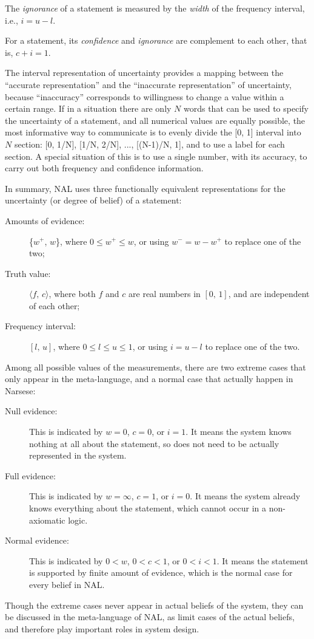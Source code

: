 \begin{defi}
The {\em ignorance} of a statement is measured by the {\em width} of the frequency interval, i.e., \(i = u - l\).
\end{defi}

\begin{theo}
For a statement, its \emph{confidence} and \emph{ignorance} are complement to each other, that is, \(c + i = 1\).
\end{theo}

The interval representation of uncertainty provides a mapping between the ``accurate representation'' and the ``inaccurate representation'' of uncertainty, because ``inaccuracy'' corresponds to willingness to change a value within a certain range.  If in a situation there are only $N$ words that can be used to specify the uncertainty of a statement, and all numerical values are equally possible, the most informative way to communicate is to evenly divide the [0, 1] interval into $N$ section: [0, 1/N], [1/N, 2/N], ..., [(N-1)/N, 1], and to use a label for each section. A special situation of this is to use a single number, with its accuracy, to carry out both frequency and confidence information. 

In summary, NAL uses three functionally equivalent representations for the uncertainty (or degree of belief) of a statement: 
\begin{description}
\item[Amounts of evidence:]
\{$w^+$, $w$\}, where \(0 \leq w^+ \leq w\), or using \(w^- = w - w^+\) to replace one of the two;
\item[Truth value:]
\(\langle  f, \, c \rangle \), where both $f$ and $c$ are real numbers in $[0, \, 1]$, and are independent of each other;
\item[Frequency interval:]
\([l, \, u]\), where \(0 \leq l \leq u \leq 1\), or using $i = u - l$ to replace one of the two.
\end{description}

Among all possible values of the measurements, there are two extreme cases that only appear in the meta-language, and a normal case that actually happen in Narsese:
\begin{description}
\item[Null evidence:]
This is indicated by $w = 0$, $c = 0$, or $i = 1$. It means the system knows nothing at all about the statement, so does not need to be actually represented in the system.
\item[Full evidence:]
This is indicated by \(w = \infty\), \(c = 1\), or \(i = 0\). It means the system already knows everything about the statement, which cannot occur in a non-axiomatic logic.
\item[Normal evidence:]
This is indicated by \(0 < w\), \(0 < c < 1\), or \(0 < i < 1\). It means the statement is supported by finite amount of evidence, which is the normal case for every belief in NAL.
\end{description}
Though the extreme cases never appear in actual beliefs of the system, they can be discussed in the meta-language of NAL, as limit cases of the actual beliefs, and therefore play important roles in system design. 

